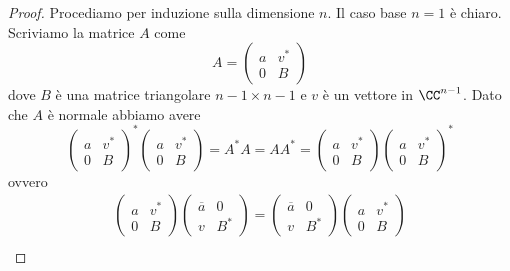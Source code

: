 \documentclass[11pt]{scrartcl}
\begin{document}
   	 \begin{proof}
   	 	Procediamo per induzione sulla dimensione $n$. Il caso base $n=1$ è chiaro. Scriviamo la matrice $A$ come
   	 	$$A=
   	 	\left(
   	 	\begin{array}{c|c}
   	 		a & v^* \\
   	 		\hline
   	 		0 & B
   	 	\end{array}
   	 	\right)
   	 	$$
   	 	dove $B$ è una matrice triangolare $n-1\times n-1$ e $v$ è un vettore in $\CC^{n-1}$. Dato che $A$ è normale abbiamo avere
   	 	$$
   	 	\left(
   	 	\begin{array}{c|c}
   	 		a & v^* \\
   	 		\hline
   	 		0 & B
   	 	\end{array}
   	 	\right)^*
   	 	\left(
   	 	\begin{array}{c|c}
   	 		a & v^* \\
   	 		\hline
   	 		0 & B
   	 	\end{array}
   	 	\right)
   	 	=A^*A=AA^*=
   	 	\left(
   	 	\begin{array}{c|c}
   	 		a & v^* \\
   	 		\hline
   	 		0 & B
   	 	\end{array}
   	 	\right)
   	 	\left(
   	 	\begin{array}{c|c}
   	 		a & v^* \\
   	 		\hline
   	 		0 & B
   	 	\end{array}
   	 	\right)^*
   	 	$$
   	 	ovvero
   	 	\begin{gather*}
   	 		\left(
   	 		\begin{array}{c|c}
   	 			a & v^* \\
   	 			\hline
   	 			0 & B
   	 		\end{array}
   	 		\right)
   	 		\left(
   	 		\begin{array}{c|c}
   	 			\overline{a} & 0 \\
   	 			\hline
   	 			v & B^*
   	 		\end{array}
   	 		\right)
   	 		=
   	 		\left(
   	 		\begin{array}{c|c}
   	 			\overline{a} & 0 \\
   	 			\hline
   	 			v & B^*
   	 		\end{array}
   	 		\right)
   	 		\left(
   	 		\begin{array}{c|c}
   	 			a & v^* \\
   	 			\hline
   	 			0 & B
   	 		\end{array}
   	 		\right) \\

\end{gather*}
\end{proof}
\end{document}
